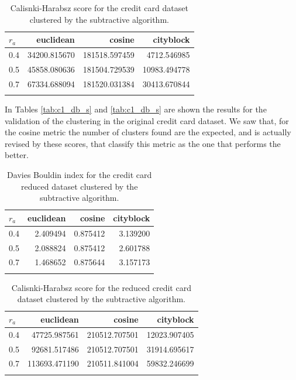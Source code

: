 \documentclass[conference]{IEEEtran}
\begin{document}
    \begin{table}[ht!]
        \centering
        \begin{tabular}{lrrr}
        \toprule
        $r_a$ &     euclidean &         cosine &     cityblock \\
        \midrule
        0.4 &  34200.815670 &  181518.597459 &   4712.546985 \\
        0.5 &  45858.080636 &  181504.729539 &  10983.494778 \\
        0.7 &  67334.688094 &  181520.031384 &  30413.670844 \\
        \bottomrule \\
        \end{tabular}
        \caption{Calisnki-Harabsz score for the credit card dataset clustered by the subtractive algorithm.}
        \label{tab:c1_ch_s}
    \end{table}
    
    In Tables \ref{tab:c1_db_s} and \ref{tab:c1_db_s} are shown the results for the validation of the clustering in the original credit card dataset. We saw that, for the cosine metric the number of clusters found are the expected, and is actually revised by these scores, that classify this metric as the one that performs the better. \\
    
    \begin{table}[ht!]
        \centering
        \begin{tabular}{lrrr}
        \toprule
        $r_a$ &  euclidean &    cosine &  cityblock \\
        \midrule
        0.4 &   2.409494 &  0.875412 &   3.139200 \\
        0.5 &   2.088824 &  0.875412 &   2.601788 \\
        0.7 &   1.468652 &  0.875644 &   3.157173 \\
        \bottomrule \\
        \end{tabular}
        \caption{Davies Bouldin index for the credit card reduced dataset clustered by the subtractive algorithm.}
        \label{tab:c2_db_s}
    \end{table}
    
    \begin{table}[ht!]
        \centering
        \begin{tabular}{lrrr}
        \toprule
        $r_a$ &      euclidean &         cosine &     cityblock \\
        \midrule
        0.4 &   47725.987561 &  210512.707501 &  12023.907405 \\
        0.5 &   92681.517486 &  210512.707501 &  31914.695617 \\
        0.7 &  113693.471190 &  210511.841004 &  59832.246699 \\
        \bottomrule \\
        \end{tabular}
        \caption{Calisnki-Harabsz score for the reduced credit card dataset clustered by the subtractive algorithm.}
        \label{tab:c2_ch_s}
    \end{table}
    
\end{document}
